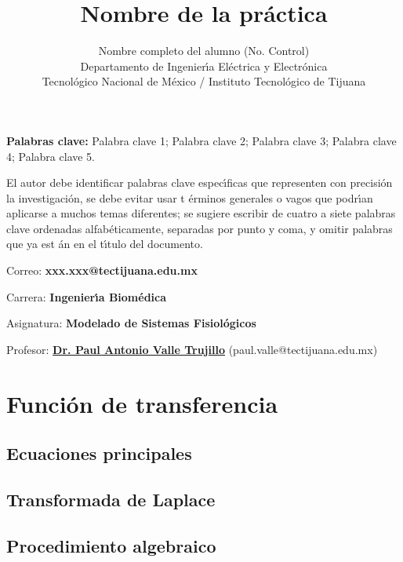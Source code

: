 \documentclass[letterpaper,11pt]{article}
\begin{document}
\title{Nombre de la pr\'{a}ctica}
\author{Nombre completo del alumno (No. Control) \\
Departamento de Ingenier\'{\i}a El\'{e}ctrica y Electr\'{o}nica\\
Tecnol\'{o}gico Nacional de M\'{e}xico / Instituto Tecnol\'{o}gico de Tijuana%
}
\maketitle

\noindent \textbf{Palabras clave: }Palabra clave 1; Palabra clave 2; Palabra
clave 3; Palabra clave 4; Palabra clave 5.

\noindent El autor debe identificar palabras clave espec\'{\i}ficas que
representen con precisi\'{o}n la investigaci\'{o}n, se debe evitar usar t%
\'{e}rminos generales o vagos que podr\'{\i}an aplicarse a muchos temas
diferentes; se sugiere escribir de cuatro a siete palabras clave ordenadas
alfab\'{e}ticamente, separadas por punto y coma, y omitir palabras que ya est%
\'{a}n en el t\'{\i}tulo del documento.

\bigskip

\noindent Correo: \textbf{xxx.xxx@tectijuana.edu.mx}

\noindent \noindent Carrera: \textbf{Ingenier\'{\i}a Biom\'{e}dica}

\noindent Asignatura: \textbf{Modelado de Sistemas Fisiol\'{o}gicos}

\noindent Profesor: \href{https://biomath.xyz/}{\textbf{Dr. Paul Antonio
Valle Trujillo}} (paul.valle@tectijuana.edu.mx)

\section{Funci\'{o}n de transferencia}

\subsection{Ecuaciones principales}

\subsection{Transformada de Laplace}

\subsection{Procedimiento algebraico}
\end{document}
